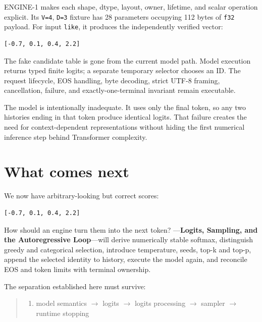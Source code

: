 ENGINE-1 makes each shape, dtype, layout, owner, lifetime, and scalar
operation explicit. Its \texttt{V=4}, \texttt{D=3} fixture has 28
parameters occupying 112 bytes of \texttt{f32} payload. For input
\texttt{like}, it produces the independently verified vector:

\begin{verbatim}
[-0.7, 0.1, 0.4, 2.2]
\end{verbatim}

The fake candidate table is gone from the current model path. Model
execution returns typed finite logits; a separate temporary selector
chooses an ID. The request lifecycle, EOS handling, byte decoding,
strict UTF-8 framing, cancellation, failure, and exactly-one-terminal
invariant remain executable.

The model is intentionally inadequate. It uses only the final token, so
any two histories ending in that token produce identical logits. That
failure creates the need for context-dependent representations without
hiding the first numerical inference step behind Transformer complexity.

\section{What comes next}\label{what-comes-next}

We now have arbitrary-looking but correct scores:

\begin{verbatim}
[-0.7, 0.1, 0.4, 2.2]
\end{verbatim}

How should an engine turn them into the next token? ---\textbf{Logits, Sampling, and the Autoregressive Loop}---will derive
numerically stable softmax, distinguish greedy and categorical
selection, introduce temperature, seeds, top-k and top-p, append the
selected identity to history, execute the model again, and reconcile EOS
and token limits with terminal ownership.

The separation established here must survive:

\begin{quote}
\begin{enumerate}
\item model semantics  \(\longrightarrow\)  logits  \(\longrightarrow\)  logits processing  \(\longrightarrow\)  sampler  \(\longrightarrow\)  runtime stopping
\end{enumerate}
\end{quote}

